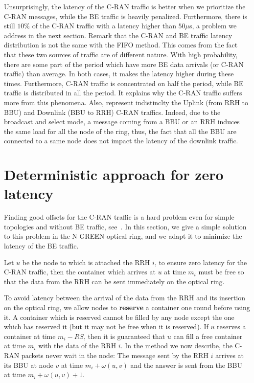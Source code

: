 \documentclass[10pt, conference, letterpaper]{IEEEtran}
\begin{document}
Unsurprisingly, the latency of the C-RAN traffic is better when we prioritize the C-RAN messages, while the BE traffic is heavily penalized. Furthermore, there is still $10\%$ of the C-RAN traffic with a latency higher than $50 \mu$s, a problem we address in the next section. Remark that the C-RAN and BE traffic latency distribution is not the same with the FIFO method. This comes from the fact that these two sources of traffic are of different nature. With high probability, there are some part of the period which have more 
BE data arrivals (or C-RAN traffic) than average. In both cases, it makes the latency higher during these times. Furthermore, C-RAN traffic is concentrated on half the period, while BE traffic is distributed in all the period.
It explains why the C-RAN traffic suffers more from this phenomena.
Also, represent indistinclty the Uplink (from RRH to BBU) and Downlink (BBU to RRH) C-RAN traffics. Indeed, due to the broadcast and select mode, a message coming from a BBU or an RRH induces the same load for all the node of the ring, thus, the fact that all the BBU are connected to a same node does not impact the latency of the downlink traffic.


\section{Deterministic approach for zero latency} \label{sec:deterministicalgorithms}

Finding good offsets for the C-RAN traffic is a hard problem even for simple topologies and without BE traffic, see~\cite{dominique2018deterministic}. In this section, we give a simple solution to this problem in the N-GREEN optical ring, and we adapt it to minimize the latency of the BE traffic.

Let $u$ be the node to which is attached the RRH $i$, to ensure zero latency for the C-RAN traffic, then the container which arrives at $u$ at time $m_i$ must be free so that the data from the RRH can be sent immediately on the optical ring. 

To avoid latency between the arrival of the data from the RRH and its insertion on the optical ring, 
we allow nodes to \textbf{reserve} a container one round before using it. A container which is reserved cannot be filled by any node except the one which has reserved it (but it may not be free when it is reserved). 
If $u$ reserves a container at time $m_i - RS$, then it is guaranteed that $u$ can fill a free container at time $m_i$ with the data of the RRH $i$.
In the method we now describe, the C-RAN packets never wait in the node: The message sent by the RRH $i$ arrives at its BBU at node $v$ at time $m_i + \omega(u,v)$ and the answer is sent from the BBU at time $m_i + \omega(u,v) +1$.
\end{document}
